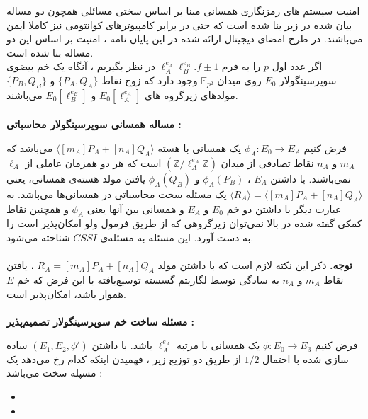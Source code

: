امنیت سیستم های رمزنگاری همسانی مبنا بر اساس سختی مسائلی همچون دو مساله  بیان شده در زیر بنا شده است که حتی در برابر کامپیوترهای کوانتومی نیز کاملا ایمن می‌باشند. در طرح امضای دیجیتال ارائه شده در این پایان نامه ، امنیت بر اساس این دو مساله بنا شده است.\\


اگر عدد اول 
$p$
را به فرم
$\ell_A^{e_A} \ell_B^{e_B} . f \pm 1 $
در نظر بگیریم ، آنگاه یک خم بیضوی سوپرسینگولار 
$E_0$
روی میدان
$\mathbb{F}_{p^2}$
وجود دارد که زوج نقاط
$\{P_A , Q_A \}$
و
$\{ P_B , Q_B \}$
مولدهای زیرگروه های
$E_0[\ell_A^{e_A}]$
و
$E_0[\ell_B^{e_B}]$
می‌باشند. 
\\
\\
\textbf{ مساله همسانی سوپرسینگولار محاسباتی :‌}

فرض کنیم 
$\phi_A :‌E_0 \rightarrow E_A $
یک همسانی  با هسته 
$\langle [m_A]P_A + [n_A]Q_A \rangle $
می‌باشد که
$m_A$
و
$n_A$
نقاط تصادفی از میدان
$ (\mathbb{Z} / \ell_A^{e_A} \mathbb{Z}) $
است که هر دو همزمان عاملی از 
$\ell_A$
نمی‌باشند.
با داشتن
$E_A$
،
$\phi_A(P_B)$
و
$\phi_A(Q_B)$
 یافتن مولد هسته‌ی همسانی، یعنی
$\langle R_A \rangle  = \langle [m_A]P_A + [n_A]Q_A \rangle $
یک مسئله سخت محاسباتی در همسانی‌ها می‌باشد. به عبارت دیگر با داشتن دو خم 
$E_0$
و
$E_A$
و همسانی بین آنها یعنی
$\phi_{A}$
و همچنین نقاط کمکی گفته شده در بالا نمی‌توان زیرگروهی که از طریق فرمول ولو امکان‌پذیر است را به دست آورد. این مسئله به مسئله‌ی 
$CSSI$
شناخته می‌شود.
\\
\\
\textbf{توجه.}
ذکر این نکته لازم است که با داشتن مولد
$R_A = [m_A]P_A + [n_A]Q_A$
، یافتن نقاط
$m_A$
و
$n_A$
به سادگی توسط لگاریتم گسسته توسیع‌یافته
 با این فرض که خم 
$E$
هموار باشد، امکان‌پذیر است.
\cite{eDS}
\\
\\
\textbf{ مسئله ساخت خم سوپرسینگولار تصمیم‌پذیر : }

فرض کنیم
$\phi : E_0 \rightarrow E_3$
یک همسانی با مرتبه 
$\ell_A^{e_A}$
باشد. با داشتن
$(E_1 , E_2 , {\phi}' )$
 ساده سازی شده با احتمال 
 $1/2$
 از طریق دو توزیع زیر ، فهمیدن اینکه کدام رخ می‌دهد یک مسپله سخت می‌باشد :
 \begin{itemize}
 	
 	\item 
 	
 	\item 
 	
 \end{itemize}
 


